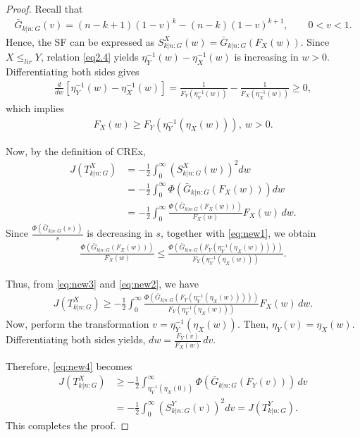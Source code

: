 \documentclass[10pt,a4paper]{amsart}
\begin{document}
\begin{proof}
Recall that
\begin{align*}
    \bar G_{k|n:G}(v)
    =
    (n-k+1)(1-v)^k-(n-k)(1-v)^{k+1},
    \qquad 0<v<1.
\end{align*}
Hence, the SF  can be expressed as
$S^X_{k|n:G}(w)
    =
    \bar G_{k|n:G}(F_X(w)).$ Since $X\leq_{lir}Y$, relation \eqref{eq2.4} yields $\eta_Y^{-1}(w)-\eta_X^{-1}(w)$
is increasing in $w>0$. Differentiating both sides gives
\begin{align*}
    \frac{d}{dw}
    \left[
    \eta_Y^{-1}(w)-\eta_X^{-1}(w)
    \right]
    =
    \frac{1}{F_Y(\eta_Y^{-1}(w))}
    -
    \frac{1}{F_X(\eta_X^{-1}(w))}
    \geq 0,
\end{align*}
which implies
\begin{align}\label{eq:new1}
    F_X(w)
    \geq
    F_Y\!\left(
    \eta_Y^{-1}(\eta_X(w))
    \right),~ w>0.
\end{align}

Now, by the definition of CREx,
\begin{align}
    J(T^X_{k|n:G})
    &=
    -\frac12
    \int_0^\infty
    \left(
    S^X_{k|n:G}(w)
    \right)^2
    dw
    \nonumber\\
    &=-\frac12
    \int_0^\infty
    \Phi\!\left(
    \bar G_{k|n:G}(F_X(w))
    \right)
    dw
    \nonumber\\
    &=-\frac12
    \int_0^\infty
    \frac{
    \Phi\!\left(
    \bar G_{k|n:G}(F_X(w))
    \right)
    }{F_X(w)}
    F_X(w)\,dw.
    \label{eq:new2}
\end{align}
Since $\frac{\Phi(\bar G_{k|n:G}(s))}{s}$
is decreasing in $s$, together with \eqref{eq:new1}, we obtain
\begin{align}
    \frac{
    \Phi(\bar G_{k|n:G}(F_X(w)))
    }{F_X(w)}
    \leq
    \frac{
    \Phi\!\left(
    \bar G_{k|n:G}
    \left(
    F_Y(\eta_Y^{-1}(\eta_X(w)))
    \right)
    \right)
    }{
    F_Y(\eta_Y^{-1}(\eta_X(w)))
    }.
    \label{eq:new3}
\end{align}

Thus, from \eqref{eq:new3} and \eqref{eq:new2}, we have
\begin{align}
    J(T^X_{k|n:G})
    \geq -\frac12
    \int_0^\infty
    \frac{
    \Phi\!\left(
    \bar G_{k|n:G}
    \left(
    F_Y(\eta_Y^{-1}(\eta_X(w)))
    \right)
    \right)
    }{
    F_Y(\eta_Y^{-1}(\eta_X(w)))
    }
    F_X(w)\,dw.
    \label{eq:new4}
\end{align}
Now, perform the transformation $v=\eta_Y^{-1}(\eta_X(w)).$
Then, 
$\eta_Y(v)=\eta_X(w).$
Differentiating both sides yields, 
$dw
    =
    \frac{F_Y(v)}{F_X(w)}\,dv.$

Therefore, \eqref{eq:new4} becomes
\begin{align*}
    J(T^X_{k|n:G})
    &\geq -\frac12
    \int_{\eta_Y^{-1}(\eta_X(0))}^{\infty}
    \Phi\!\left(
    \bar G_{k|n:G}(F_Y(v))
    \right)\,dv
    \\
    &=
    -\frac12
    \int_0^\infty
    \left(
    S^Y_{k|n:G}(v)
    \right)^2
    dv=
    J(T^Y_{k|n:G}).
\end{align*}
This completes the proof.
\end{proof}
\end{document}
